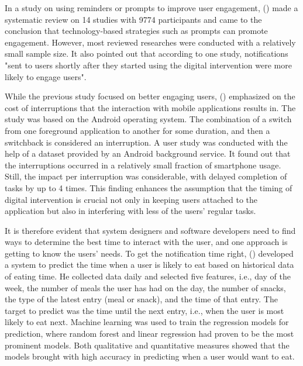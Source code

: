 \noindent In a study on using reminders or prompts to improve user engagement, \citeauthor{25_timing_review} (\citeyear{25_timing_review}) made a systematic review on 14 studies with 9774 participants and came to the conclusion that technology-based strategies such as prompts can promote engagement. However, most reviewed researches were conducted with a relatively small sample size. It also pointed out that according to one study, notifications "sent to users shortly after they started using the digital intervention were more likely to engage users".\bigskip

\noindent While the previous study focused on better engaging users, \citeauthor{26_cost_interruption} (\citeyear{26_cost_interruption}) emphasized on the cost of interruptions that the interaction with mobile applications results in. The study was based on the Android operating system. The combination of a switch from one foreground application to another for some duration, and then a switchback is considered an interruption. A user study was conducted with the help of a dataset provided by an Android background service. It found out that the interruptions occurred in a relatively small fraction of smartphone usage. Still, the impact per interruption was considerable, with delayed completion of tasks by up to 4 times. This finding enhances the assumption that the timing of digital intervention is crucial not only in keeping users attached to the application but also in interfering with less of the users' regular tasks.\bigskip

\noindent It is therefore evident that system designers and software developers need to find ways to determine the best time to interact with the user, and one approach is getting to know the users' needs. To get the notification time right, \citeauthor{27_oguz} (\citeyear{27_oguz}) developed a system to predict the time when a user is likely to eat based on historical data of eating time. He collected data daily and selected five features, i.e., day of the week, the number of meals the user has had on the day, the number of snacks, the type of the latest entry (meal or snack), and the time of that entry. The target to predict was the time until the next entry, i.e., when the user is most likely to eat next. Machine learning was used to train the regression models for prediction, where random forest and linear regression had proven to be the most prominent models. Both qualitative and quantitative measures showed that the models brought with high accuracy in predicting when a user would want to eat.

